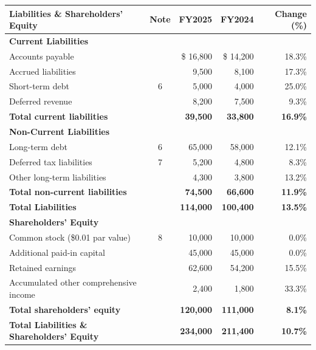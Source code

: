 \noindent
\begin{tabularx}{\textwidth}{L c R R R}
  \textbf{Liabilities \& Shareholders' Equity} & \textbf{Note} & \textbf{FY2025} & \textbf{FY2024} & \textbf{Change (\%)} \\
  \midrule
  \textbf{Current Liabilities} & & & & \\
  \quad Accounts payable & & \$ 16,800 & \$ 14,200 & 18.3\% \\
  \quad Accrued liabilities & & 9,500 & 8,100 & 17.3\% \\
  \quad Short-term debt & 6 & 5,000 & 4,000 & 25.0\% \\
  \quad Deferred revenue & & 8,200 & 7,500 & 9.3\% \\
  \textbf{Total current liabilities} & & \textbf{39,500} & \textbf{33,800} & \textbf{16.9\%} \\
  \midrule
  \textbf{Non-Current Liabilities} & & & & \\
  \quad Long-term debt & 6 & 65,000 & 58,000 & 12.1\% \\
  \quad Deferred tax liabilities & 7 & 5,200 & 4,800 & 8.3\% \\
  \quad Other long-term liabilities & & 4,300 & 3,800 & 13.2\% \\
  \textbf{Total non-current liabilities} & & \textbf{74,500} & \textbf{66,600} & \textbf{11.9\%} \\
  \midrule
  \textbf{Total Liabilities} & & \textbf{114,000} & \textbf{100,400} & \textbf{13.5\%} \\
  \midrule
  \textbf{Shareholders' Equity} & & & & \\
  \quad Common stock (\$0.01 par value) & 8 & 10,000 & 10,000 & 0.0\% \\
  \quad Additional paid-in capital & & 45,000 & 45,000 & 0.0\% \\
  \quad Retained earnings & & 62,600 & 54,200 & 15.5\% \\
  \quad Accumulated other comprehensive income & & 2,400 & 1,800 & 33.3\% \\
  \textbf{Total shareholders' equity} & & \textbf{120,000} & \textbf{111,000} & \textbf{8.1\%} \\
  \midrule
  \textbf{Total Liabilities \& Shareholders' Equity} & & \textbf{234,000} & \textbf{211,400} & \textbf{10.7\%} \\
  \bottomrule
\end{tabularx}

\clearpage

